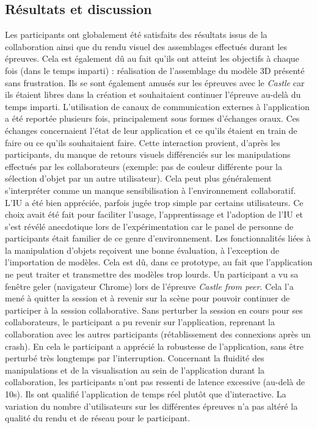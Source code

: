 \subsection{Résultats et discussion}
Les participants ont globalement été satisfaits des résultats issus de la 
collaboration ainsi que du rendu visuel des assemblages effectués durant les 
épreuves. Cela est également dû au fait qu'ils ont atteint les 
objectifs à chaque fois (dans le temps imparti) : réalisation de l'assemblage du modèle \gls{3D} 
présenté sans frustration. Ils se sont également \og amusés\fg{} sur les épreuves
avec le \textit{Castle} car ils étaient libres dans la création et souhaitaient continuer 
l'épreuve au-delà du temps imparti. L'utilisation de canaux de communication 
externes à l'application a été reportée plusieurs fois, principalement sous formes 
d'échanges oraux. Ces échanges concernaient l'état de leur application et ce qu'ils 
étaient en train de faire ou ce qu'ils souhaitaient faire. Cette interaction provient, 
d'après les participants, du manque de retours visuels différenciés sur les 
manipulations effectués par les collaborateurs (exemple: pas de couleur différente 
pour la sélection d'objet par un autre utilisateur). Cela peut plus généralement 
s'interpréter comme un manque sensibilisation à l'environnement collaboratif. 
L'\gls{IU} a été bien appréciée, parfois jugée \og trop simple\fg{} par certains 
utilisateurs. Ce choix avait été fait pour faciliter l'usage, l'apprentissage et 
l'adoption de l'\gls{IU} et s'est révélé anecdotique lors de l'expérimentation car le 
panel de personne de participants était familier de ce genre 
d'environnement.
Les fonctionnalités liées à la manipulation d'objets reçoivent une bonne évaluation, 
à l'exception de l'importation de modèles. Cela est dû, dans ce prototype, au 
fait que l'application ne peut traiter et transmettre des modèles trop lourds. Un 
participant a vu sa fenêtre \og geler\fg{} (navigateur Chrome) lors de l'épreuve 
\textit{Castle from peer}. Cela l'a mené à quitter la session et à revenir sur la 
scène pour pouvoir continuer de participer à la session collaborative. Sans 
perturber la session en cours pour ses collaborateurs, le participant a pu revenir sur 
l'application, reprenant la collaboration avec les autres participants (rétablissement 
des connexions après un crash). En cela le participant a apprécié la robustesse de 
l'application, sans être perturbé très longtemps par l'interruption.
Concernant la fluidité des manipulations et de la visualisation au sein de 
l'application durant la collaboration, les participants n'ont pas ressenti de latence 
excessive (au-delà de 10s). Ils ont qualifié l'application de \og temps réel\fg{} plutôt 
que d'\og interactive\fg{}. La variation du nombre d'utilisateurs sur les différentes 
épreuves n'a pas altéré la qualité du rendu et de réseau pour le participant.

